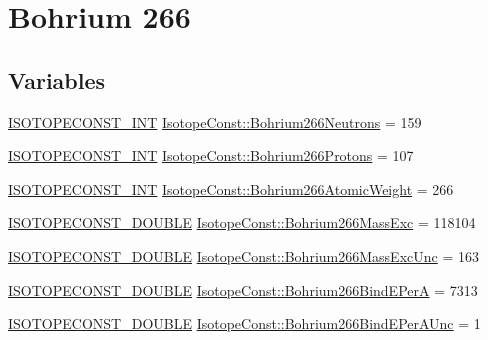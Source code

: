 \hypertarget{group___isotope_const-_bohrium-_bh266}{}\section{Bohrium 266}
\label{group___isotope_const-_bohrium-_bh266}
\subsection*{Variables}
\begin{DoxyCompactItemize}
\item 
\mbox{\hyperlink{group___isotope_const-_macros_ga5f18360b3e99483a35c32d789e62621c}{I\+S\+O\+T\+O\+P\+E\+C\+O\+N\+S\+T\+\_\+\+I\+NT}} \mbox{\hyperlink{group___isotope_const-_bohrium-_bh266_gaa90f5db3154036344c1fcf1f29400d0d}{Isotope\+Const\+::\+Bohrium266\+Neutrons}} = 159
\item 
\mbox{\hyperlink{group___isotope_const-_macros_ga5f18360b3e99483a35c32d789e62621c}{I\+S\+O\+T\+O\+P\+E\+C\+O\+N\+S\+T\+\_\+\+I\+NT}} \mbox{\hyperlink{group___isotope_const-_bohrium-_bh266_gaac734ea218a0169206acaa01c0f919ee}{Isotope\+Const\+::\+Bohrium266\+Protons}} = 107
\item 
\mbox{\hyperlink{group___isotope_const-_macros_ga5f18360b3e99483a35c32d789e62621c}{I\+S\+O\+T\+O\+P\+E\+C\+O\+N\+S\+T\+\_\+\+I\+NT}} \mbox{\hyperlink{group___isotope_const-_bohrium-_bh266_ga23a819516107a7455a9efdf7e7d83df6}{Isotope\+Const\+::\+Bohrium266\+Atomic\+Weight}} = 266
\item 
\mbox{\hyperlink{group___isotope_const-_macros_ga8f45a7272ce02c0b4c65c44636ed719a}{I\+S\+O\+T\+O\+P\+E\+C\+O\+N\+S\+T\+\_\+\+D\+O\+U\+B\+LE}} \mbox{\hyperlink{group___isotope_const-_bohrium-_bh266_ga57148c72d0dfb9fb255469416a10c8c5}{Isotope\+Const\+::\+Bohrium266\+Mass\+Exc}} = 118104
\item 
\mbox{\hyperlink{group___isotope_const-_macros_ga8f45a7272ce02c0b4c65c44636ed719a}{I\+S\+O\+T\+O\+P\+E\+C\+O\+N\+S\+T\+\_\+\+D\+O\+U\+B\+LE}} \mbox{\hyperlink{group___isotope_const-_bohrium-_bh266_ga10026c4909598cffda3a2183a3d76df8}{Isotope\+Const\+::\+Bohrium266\+Mass\+Exc\+Unc}} = 163
\item 
\mbox{\hyperlink{group___isotope_const-_macros_ga8f45a7272ce02c0b4c65c44636ed719a}{I\+S\+O\+T\+O\+P\+E\+C\+O\+N\+S\+T\+\_\+\+D\+O\+U\+B\+LE}} \mbox{\hyperlink{group___isotope_const-_bohrium-_bh266_ga7fc5cd31eeb529b281dbfbfeac3dc812}{Isotope\+Const\+::\+Bohrium266\+Bind\+E\+PerA}} = 7313
\item 
\mbox{\hyperlink{group___isotope_const-_macros_ga8f45a7272ce02c0b4c65c44636ed719a}{I\+S\+O\+T\+O\+P\+E\+C\+O\+N\+S\+T\+\_\+\+D\+O\+U\+B\+LE}} \mbox{\hyperlink{group___isotope_const-_bohrium-_bh266_gaea406d786b2af39fff75b39e5c374baa}{Isotope\+Const\+::\+Bohrium266\+Bind\+E\+Per\+A\+Unc}} = 1

\end{DoxyCompactItemize}

